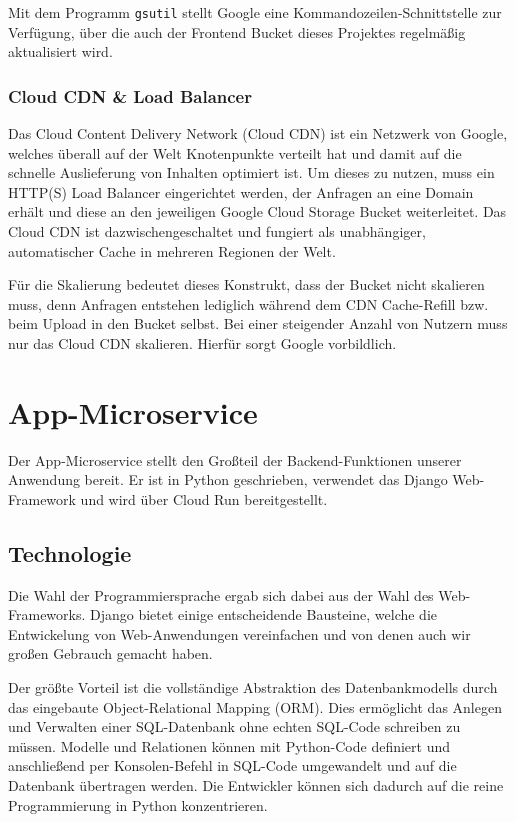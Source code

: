 \documentclass{article}
\begin{document}
Mit dem Programm \texttt{gsutil} stellt Google eine Kommandozeilen-Schnittstelle zur Verfügung, über die auch der Frontend Bucket dieses Projektes regelmäßig aktualisiert wird.


\subsubsection{Cloud CDN \& Load Balancer}

Das Cloud Content Delivery Network (Cloud CDN) ist ein Netzwerk von Google, welches überall auf der Welt Knotenpunkte verteilt hat und damit auf die schnelle Auslieferung von Inhalten optimiert ist. Um dieses zu nutzen, muss ein HTTP(S) Load Balancer eingerichtet werden, der Anfragen an eine Domain erhält und diese an den jeweiligen Google Cloud Storage Bucket weiterleitet. Das Cloud CDN ist dazwischengeschaltet und fungiert als unabhängiger, automatischer Cache in mehreren Regionen der Welt.

Für die Skalierung bedeutet dieses Konstrukt, dass der Bucket nicht skalieren muss, denn Anfragen entstehen lediglich während dem CDN Cache-Refill bzw. beim Upload in den Bucket selbst. Bei einer steigender Anzahl von Nutzern muss nur das Cloud CDN skalieren. Hierfür sorgt Google vorbildlich.


\section{App-Microservice} %
\label{sec:app-microservice}

Der App-Microservice stellt den Großteil der Backend-Funktionen unserer Anwendung bereit. Er ist in Python geschrieben, verwendet das Django Web-Framework und wird über Cloud Run bereitgestellt.

\subsection{Technologie}
\label{sec:app-tech}

Die Wahl der Programmiersprache ergab sich dabei aus der Wahl des Web-Frameworks. Django bietet einige entscheidende Bausteine, welche die Entwickelung von Web-Anwendungen vereinfachen und von denen auch wir großen Gebrauch gemacht haben. 

Der größte Vorteil ist die vollständige Abstraktion des Datenbankmodells durch das eingebaute Object-Relational Mapping (ORM). Dies ermöglicht das Anlegen und Verwalten einer SQL-Datenbank ohne echten SQL-Code schreiben zu müssen. Modelle und Relationen können mit Python-Code definiert und anschließend per Konsolen-Befehl in SQL-Code umgewandelt und auf die Datenbank übertragen werden. Die Entwickler können sich dadurch auf die reine Programmierung in Python konzentrieren.
\end{document}

